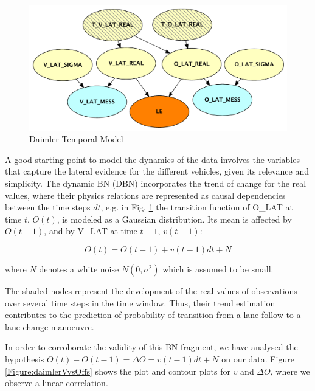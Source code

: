 \begin{figure}
\begin{center}
\includegraphics[scale=0.5]{./figures/DaimlerLEdyn.pdf}
\end{center}
\caption{\label{Figure:daimlerLEdyn}Daimler Temporal Model}
\end{figure}


A good starting point to model the dynamics of the data involves the variables that capture the lateral evidence for the different vehicles, given its relevance and simplicity. 
The dynamic BN (DBN) incorporates the trend of change for the real values, where their physics relations are represented as causal dependencies between the time steps $dt$, e.g. in Fig. \ref{Figure:daimlerLEdyn} the transition function of O\_LAT at time $t$, $O(t)$, is modeled as a Gaussian distribution. Its mean is affected by $O(t-1)$, and by V\_LAT at time $t-1$, $v(t-1)$:

\begin{equation}
O(t) =O(t-1) +v(t-1)dt +N
\end{equation}

where $N$ denotes a white noise $N(0,\sigma^2)$ which is assumed to be small.

The shaded nodes represent the development of the real values of observations over several time steps in the time window. Thus, their trend estimation contributes to the prediction of probability of transition from a lane follow to a lane change manoeuvre.

In order to corroborate the validity of this BN fragment, we have analysed the hypothesis $O(t) - O(t-1) = \Delta O = v(t-1)dt +N$ on our data. Figure \ref{Figure:daimlerVvsOffs} shows the plot and contour plots for $v$ and $\Delta O$, where we observe a linear correlation. 

